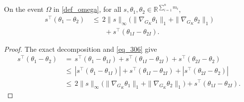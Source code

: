 \documentclass[twoside,11pt]{article}
\newenvironment{revision}{\color{revisionred}}{}
\begin{document}



\begin{revision}
\begin{lemma}
\label{lemma_16}
On the event $\Omega$ in \eqref{def_omega}, for all
$s,\theta_1,\theta_2\in\mathbb R^{\sum_{i=1}^n m_i}$,
\[
\begin{aligned}
s^\top(\theta_1-\theta_2)
&\,\leq\,2\|s\|_\infty
 \bigl(\|\nabla_{G_K}\theta_1\|_1+
       \|\nabla_{G_K}\theta_2\|_1\bigr)\\
&\qquad+s^\top(\theta_{1I}-\theta_{2I}).
\end{aligned}
\]
\end{lemma}
\begin{proof}
The exact decomposition and \eqref{eq_306} give
\begin{align*}
s^\top(\theta_1-\theta_2)
&\,=\,s^\top(\theta_1-\theta_{1I})
     +s^\top(\theta_{1I}-\theta_{2I})
     +s^\top(\theta_{2I}-\theta_2)\\
&\,\leq\,|s^\top(\theta_1-\theta_{1I})|
       +s^\top(\theta_{1I}-\theta_{2I})
       +|s^\top(\theta_{2I}-\theta_2)|\\
&\,\leq\,2\|s\|_\infty
 \bigl(\|\nabla_{G_K}\theta_1\|_1+
       \|\nabla_{G_K}\theta_2\|_1\bigr)
       +s^\top(\theta_{1I}-\theta_{2I}).
\end{align*}
\end{proof}
\end{revision}
\end{document}
